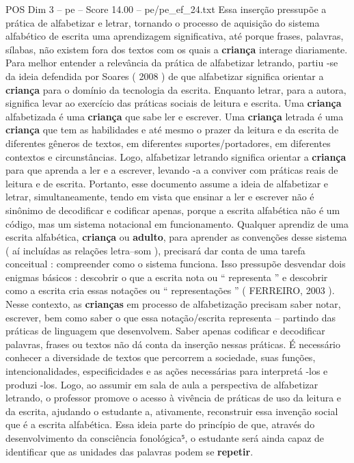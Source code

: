 \begin{textsample}{POS Dim 3 – pe – Score 14.00 – pe/pe\_ef\_24.txt}
Essa inserção pressupõe a prática de alfabetizar e letrar, tornando o processo de aquisição do sistema alfabético de escrita uma aprendizagem significativa, até porque frases, palavras, sílabas, não existem fora dos textos com os quais a \textbf{criança} interage diariamente.
Para melhor entender a relevância da prática de alfabetizar letrando, partiu -se da ideia defendida por Soares ( 2008 ) de que alfabetizar significa orientar a \textbf{criança} para o domínio da tecnologia da escrita.
Enquanto letrar, para a autora, significa levar ao exercício das práticas sociais de leitura e escrita.
Uma \textbf{criança} alfabetizada é uma \textbf{criança} que sabe ler e escrever.
Uma \textbf{criança} letrada é uma \textbf{criança} que tem as habilidades e até mesmo o prazer da leitura e da escrita de diferentes gêneros de textos, em diferentes suportes/portadores, em diferentes contextos e circunstâncias.
Logo, alfabetizar letrando significa orientar a \textbf{criança} para que aprenda a ler e a escrever, levando -a a conviver com práticas reais de leitura e de escrita.
Portanto, esse documento assume a ideia de alfabetizar e letrar, simultaneamente, tendo em vista que ensinar a ler e escrever não é sinônimo de decodificar e codificar apenas, porque a escrita alfabética não é um código, mas um sistema notacional em funcionamento.
Qualquer aprendiz de uma escrita alfabética, \textbf{criança} ou \textbf{adulto}, para aprender as convenções desse sistema ( aí incluídas as relações letra–som ), precisará dar conta de uma tarefa conceitual : compreender como o sistema funciona.
Isso pressupõe desvendar dois enigmas básicos : descobrir o que a escrita nota ou “ representa ” e descobrir como a escrita cria essas notações ou “ representações ” ( FERREIRO, 2003 ).
Nesse contexto, as \textbf{crianças} em processo de alfabetização precisam saber notar, escrever, bem como saber o que essa notação/escrita representa – partindo das práticas de linguagem que desenvolvem.
Saber apenas codificar e decodificar palavras, frases ou textos não dá conta da inserção nessas práticas.
É necessário conhecer a diversidade de textos que percorrem a sociedade, suas funções, intencionalidades, especificidades e as ações necessárias para interpretá -los e produzi -los.
Logo, ao assumir em sala de aula a perspectiva de alfabetizar letrando, o professor promove o acesso à vivência de práticas de uso da leitura e da escrita, ajudando o estudante a, ativamente, reconstruir essa invenção social que é a escrita alfabética.
Essa ideia parte do princípio de que, através do desenvolvimento da consciência fonológica⁵, o estudante será ainda capaz de identificar que as unidades das palavras podem se \textbf{repetir}.

\end{textsample}
